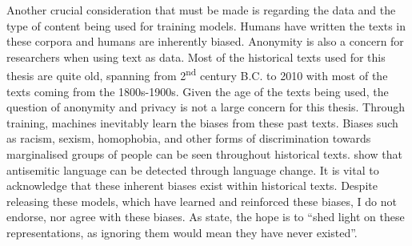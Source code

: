 Another crucial consideration that must be made is regarding the data and the type of content being used for training models. Humans have written the texts in these corpora and humans are inherently biased. Anonymity is also a concern for researchers when using text as data. Most of the historical texts used for this thesis are quite old, spanning from 2\textsuperscript{nd} century B.C. to 2010 with most of the texts coming from the 1800s-1900s. Given the age of the texts being used, the question of anonymity and privacy is not a large concern for this thesis. Through training, machines inevitably learn the biases from these past texts. Biases such as racism, sexism, homophobia, and other forms of discrimination towards marginalised groups of people can be seen throughout historical texts. \citet{tripodi-etal-2019-tracing} show that antisemitic language can be detected through language change. It is vital to acknowledge that these inherent biases exist within historical texts. Despite releasing these models, which have learned and reinforced these biases, I do not endorse, nor agree with these biases. As \citet{hengchen-tahmasebi_2021-swedishdiachronic} state, the hope is to “shed light on these representations, as ignoring them would mean they have never existed”. 
